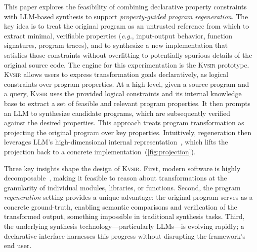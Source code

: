 \documentclass[sigplan,review,anonymous,10pt]{acmart}
\def\eg{{\em e.g.}, }
\newcommand{\sys}{{\scshape Kv{\textalpha}sir}\xspace}
\begin{document}
This paper explores the feasibility of combining declarative property
constraints with LLM-based synthesis to support \emph{property-guided program regeneration}.
The key idea is to treat the original program as an untrusted reference from
which to extract minimal, verifiable properties (\eg input-output behavior,
function signatures, program traces), and to synthesize a new implementation that satisfies those
constraints without overfitting to potentially spurious details of the original source code.
The engine for this experimentation is the \sys prototype.
\sys allows users
to express transformation goals declaratively, as logical constraints over
program properties.
At a high level, given a source program and a query, \sys uses the provided
logical constraints and its internal knowledge base to extract a set of
feasible and relevant program properties.
It then prompts an LLM to synthesize
candidate programs, which are subsequently verified against the desired properties.
This approach treats program transformation as projecting the original program over key properties.
Intuitively, regeneration then leverages LLM's high-dimensional internal representation~\cite{jin2024emergent,tao2024llms,huh2024platonicrepresentationhypothesis}, 
which lifts the projection back to a concrete implementation~(\cref{fig:projection}).

Three key insights shape the design of \sys.
First, modern software is highly decomposable~\cite{vfunction2024modular, isoline2018decomposition, schechter2011visualizing, breakapp:ndss:2018}, making it feasible to reason about transformations at the granularity of individual modules, libraries, or functions.
Second, the program \emph{regeneration} setting provides a unique advantage: the original program serves as a concrete ground-truth, enabling semantic comparisons and verification of the transformed output, something impossible in traditional synthesis tasks.
Third, the underlying synthesis technology---particularly LLMs---is evolving rapidly; a declarative interface harnesses this progress without disrupting the framework's end user.

\end{document}
